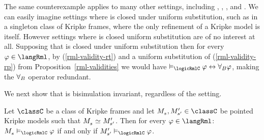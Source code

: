 The same counterexample applies to many other settings, including \classKF{}, \classKFF{}, \classKD{}, and \classS{}.
We can easily imagine settings where \logicRml{} is closed under uniform substitution, such as in a singleton class of Kripke frames, where the only refinement of a Kripke model is itself.
However settings where \logicRml{} is closed uniform substitution are of no interest at all.
Supposing that \logicRmlC{} is closed under uniform substitution then for every $\phi \in \langRml$, by (\ref{rml-validity-rt}) and a uniform substitution of (\ref{rml-validity-rp}) from Proposition~\ref{rml-validities} we would have $\entails_\logicRmlC \phi \iff \allrefsBs \phi$, making the ${\forall_{B}}$ operator redundant.

We next show that \logicRml{} is bisimulation invariant, regardless of the setting.

\begin{proposition}\label{rml-bisimulation-invariance}
Let $\classC$ be a class of Kripke frames and let $\kPModel{\kStateS}, \kPModelP{\kStateSP} \in \classC$ be pointed Kripke models such that $\kPModel{\kStateS} \bisimilar \kPModelP{\kStateSP}$.
Then for every $\phi \in \langRml$:
$\kPModel{\kStateS} \entails_\logicRmlC \phi$ if and only if $\kPModelP{\kStateSP} \entails_\logicRmlC \phi$.
\end{proposition}

